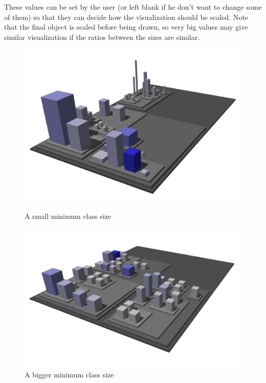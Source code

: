 \documentclass[]{usiinfbachelorproject}
\begin{document}
These values can be set by the user (or left blank if he don't want to change some of them) so that they can decide how the visualization should be scaled. Note that the final object is scaled before being drawn, so very big values may give similar visualization if the ratios between the sizes are similar.\\

\begin{figure}[H]
  \centering
  \begin{minipage}[b]{0.49\textwidth}
      \includegraphics[width=1\textwidth]{pictures/small.png}
      \caption{A small minimum class size}
      \label{fig:sizes small}
  \end{minipage}
  \hfill
  \begin{minipage}[b]{0.49\textwidth}
    \includegraphics[width=1\textwidth]{pictures/big.png}
    \caption{A bigger minimum class size}
    \label{fig:sizes small}
  \end{minipage}
\end{figure}
\end{document}
